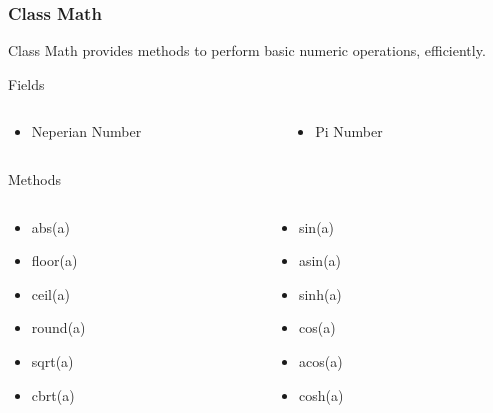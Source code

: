 \documentclass[10pt, compress]{beamer}
\begin{document}
\begin{frame}[fragile]
	\frametitle{Class Math}
	Class Math provides methods to perform basic numeric operations, efficiently.
	\begin{block}{Fields}
		\begin{columns}
			\begin{column}{0.5\textwidth}
				\begin{itemize}
					\item[] Neperian Number
				\end{itemize}
			\end{column}
			\begin{column}{0.5\textwidth}
				\begin{itemize}
					\item[] Pi Number
				\end{itemize}
			\end{column}
		\end{columns}
	\end{block}
	\begin{block}{Methods}
		\begin{columns}
			\begin{column}{0.5\textwidth}
				\begin{itemize}
					\item[] abs(a)
					\item[] floor(a)
					\item[] ceil(a)
					\item[] round(a)
					\item[] sqrt(a)
					\item[] cbrt(a)
				\end{itemize}
			\end{column}
			\begin{column}{0.5\textwidth}
				\begin{itemize}
					\item[] sin(a)
					\item[] asin(a)
					\item[] sinh(a)
					\item[] cos(a)
					\item[] acos(a)
					\item[] cosh(a)
				\end{itemize}
			\end{column}
		\end{columns}
	\end{block}
\end{frame}
\end{document}
